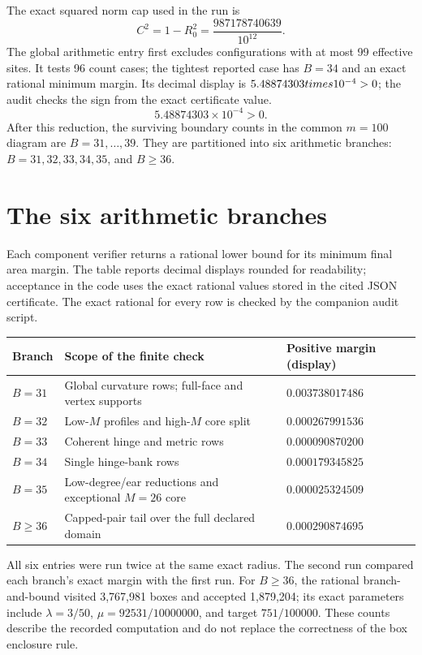 \documentclass[11pt]{article}
\newcommand{\cR}{R_0}
\begin{document}
The exact squared norm cap used in the run is
\[
 C^2=1-\cR^2=\frac{987178740639}{10^{12}}.
\]
The global arithmetic entry first excludes configurations with at most 99 effective sites. It tests 96 count cases; the tightest reported case has $B=34$ and an exact rational minimum margin. Its decimal display is $5.48874303\\times 10^{-4}>0$; the audit checks the sign from the exact certificate value.
\[
 5.48874303\times 10^{-4}>0.
\]
After this reduction, the surviving boundary counts in the common $m=100$ diagram are $B=31,\ldots,39$. They are partitioned into six arithmetic branches: $B=31,32,33,34,35$, and $B\geq36$.

\section{The six arithmetic branches}
\label{sec:branches}
Each component verifier returns a rational lower bound for its minimum final area margin. The table reports decimal displays rounded for readability; acceptance in the code uses the exact rational values stored in the cited JSON certificate. The exact rational for every row is checked by the companion audit script.
\begin{center}
\begin{tabular}{@{}lll@{}}
\toprule
Branch & Scope of the finite check & Positive margin (display)\\
\midrule
$B=31$ & Global curvature rows; full-face and vertex supports & $0.003738017486$\\
$B=32$ & Low-$M$ profiles and high-$M$ core split & $0.000267991536$\\
$B=33$ & Coherent hinge and metric rows & $0.000090870200$\\
$B=34$ & Single hinge-bank rows & $0.000179345825$\\
$B=35$ & Low-degree/ear reductions and exceptional $M=26$ core & $0.000025324509$\\
$B\geq36$ & Capped-pair tail over the full declared domain & $0.000290874695$\\
\bottomrule
\end{tabular}
\end{center}
All six entries were run twice at the same exact radius. The second run compared each branch's exact margin with the first run. For $B\geq36$, the rational branch-and-bound visited 3,767,981 boxes and accepted 1,879,204; its exact parameters include $\lambda=3/50$, $\mu=92531/10000000$, and target $751/100000$. These counts describe the recorded computation and do not replace the correctness of the box enclosure rule.
\end{document}
